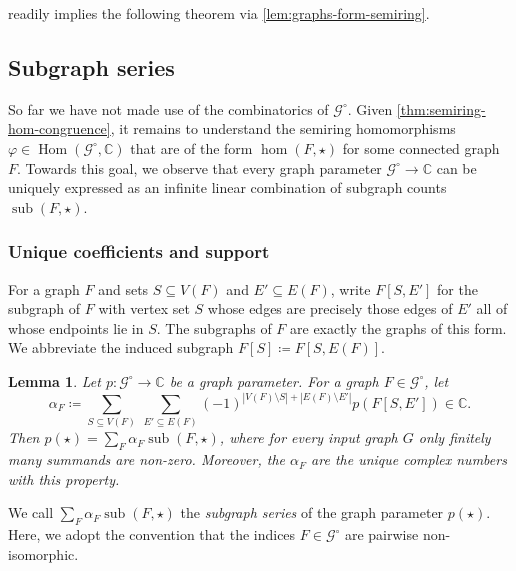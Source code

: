 \documentclass[11pt]{scrartcl}
\theoremstyle{definition}
\theoremstyle{plain}
\newtheorem{lemma}[definition]{Lemma}
\theoremstyle{remark}
\renewcommand\phi\varphi
\DeclareMathOperator\Hom{Hom}
\DeclareMathOperator{\sub}{sub}
\newcommand{\lG}{\mathcal{G}^\circ}
\begin{document}
	 readily implies the following theorem via \cref{lem:graphs-form-semiring}.
	\thmPhi*


	\subsection{Subgraph series}
	\label{sec:subgraph-series}

	So far we have not made use of the combinatorics of $\lG$.
	Given \cref{thm:semiring-hom-congruence},
	it remains to understand the semiring homomorphisms $\phi \in \Hom(\lG, \mathbb{C})$ that are of the form $\hom(F, \star)$ for some connected graph $F$.
	Towards this goal,
	we observe that every graph parameter $\lG \to \mathbb{C}$
	can be uniquely expressed as an infinite linear combination of subgraph counts $\sub(F, \star)$.



	\subsubsection{Unique coefficients and support}
	\label{sec:unique-coefficients}

	For a graph $F$ and sets $S \subseteq V(F)$ and $E' \subseteq E(F)$,
	write $F[S, E']$ for the subgraph of $F$ with vertex set $S$
	whose edges are precisely those edges of $E'$ all of whose endpoints lie in $S$.
	The subgraphs of $F$ are exactly the graphs of this form.
	We abbreviate the induced subgraph $F[S] \coloneqq F[S, E(F)]$.

	\begin{lemma}\label{lem:unique-subgraph-series}
		Let $p \colon \lG \to \mathbb{C}$ be a graph parameter.
		For a graph $F \in \lG$, let
		\[
			\alpha_F \coloneqq \sum_{S \subseteq V(F)} \ \sum_{E' \subseteq E(F)} (-1)^{|V(F) \setminus S| + |E(F) \setminus E'|}  p(F[S, E']) \in \mathbb{C}.
		\]
		Then $p(\star) = \sum_F \alpha_F \sub(F, \star)$,
		where for every input graph $G$ only finitely many summands are non-zero.
		Moreover, the $\alpha_F$ are the unique complex numbers with this property.
	\end{lemma}

	We call $\sum_F \alpha_F \sub(F, \star)$ the \emph{subgraph series} of the graph parameter $p(\star)$.
	Here, we adopt the convention that the indices $F \in \lG$ are pairwise non-isomorphic.
\end{document}

